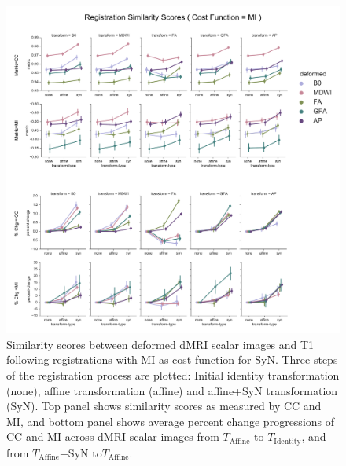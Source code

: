 \begin{figure}[H]
\includegraphics[width=\linewidth]{sup1}
\caption{Similarity scores between deformed dMRI scalar images and T1 following registrations with MI as cost function for SyN. 
Three steps of the registration process are plotted: Initial identity transformation (none), affine transformation (affine) and affine+SyN transformation (SyN).
Top panel shows similarity scores as measured by CC and MI, and bottom panel shows average percent change progressions of CC and MI across dMRI scalar images from \protect $T_{\text{Affine}}$ to \protect $T_{\text{Identity}}$, and from \protect $T_{\text{Affine}}$+SyN to\protect  $T_{\text{Affine}}$.}
\centering
\label{fig:APfigure7}
\end{figure}

